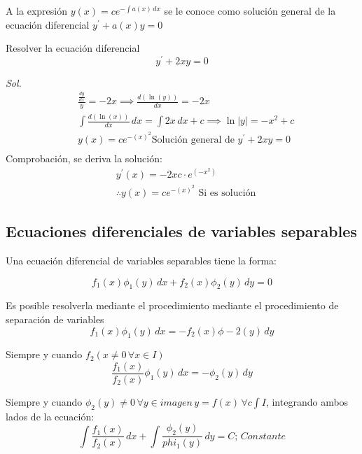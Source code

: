 A la expresión $y(x)=ce^{-\int a(x)\,dx}$ se le conoce como solución general de la ecuación diferencial $y^{\prime}+a(x)y=0$

\begin{example}
    Resolver la ecuación diferencial
    \begin{equation*}
        y^{\prime}+2xy=0
    \end{equation*}
\end{example}

\textit{ Sol. }
\begin{align*}
    &\frac{\frac{dy}{dx}}{y}=-2x\implies \frac{d\left(\ln{(y)}\right)}{dx}=-2x\\
    &\int \frac{d\left(\ln{(x)}\right)}{dx}\, dx=\int 2x\,dx +c\implies \ln{\left\lvert y\right\rvert}=-x^2+c\\
    &y(x)=ce^{-\left(x\right)^2}\text{Solución general de }y^{\prime}+2xy=0\\
\end{align*}
Comprobación, se deriva la solución:
\begin{align*}
    &y^{\prime}(x)=-2xc\cdot e^{\left(-x^{2}\right)}\\
    &\therefore y(x)=ce^{-\left(x\right)^2}\text{ Si es solución}
\end{align*}

\subsection{Ecuaciones diferenciales de variables separables}

Una ecuación diferencial de variables separables tiene la forma:

\begin{equation}
    f_1(x)\phi_1(y)\, dx+f_2(x)\phi_2(y)\, dy=0
\end{equation}

Es posible resolverla mediante el procedimiento mediante el procedimiento de separación de variables
\begin{equation*}
    f_1(x)\phi_1(y)\, dx=-f_2(x)\phi-2(y)\, dy
\end{equation*}

Siempre y cuando $f_2(x\neq 0\, \forall x\in I)$
\begin{equation*}
    \frac{f_1(x)}{f_2(x)}\phi_1(y)\,dx=-\phi_2(y)\, dy
\end{equation*}

Siempre y cuando $\phi_2(y)\neq 0\, \forall y\in imagen\, y=f(x)\, \forall c\int I$, integrando ambos lados de la ecuación: 
\begin{equation*}
\int\frac{f_1(x)}{f_2(x)}\, dx+\int \frac{\phi_2(y)}{phi_1(y)}\,dy=C;\, Constante
\end{equation*}

